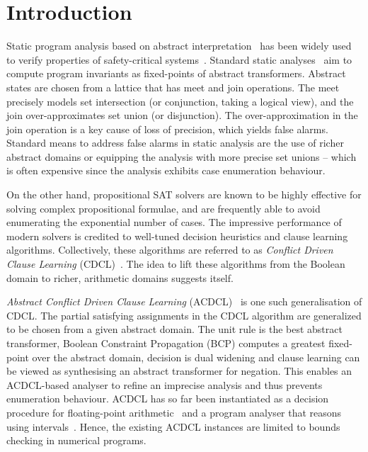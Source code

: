 \section{Introduction}

%
Static program analysis based on abstract interpretation~\cite{CC77} has
been widely used to verify properties of safety-critical systems~\cite{DBLP:conf/pldi/BlanchetCCFMMMR03}.
Standard static analyses~\cite{se2011} aim to compute program invariants as
fixed-points of abstract transformers.  Abstract states are chosen from a
lattice that has meet and join operations.  The meet precisely models set
intersection (or conjunction, taking a logical view), and the join
over-approximates set union (or disjunction).  The over-approximation in the
join operation is a key cause of loss of precision, which yields false
alarms.  Standard means to address false alarms in static analysis are
the use of richer abstract domains or equipping the analysis with more precise set
unions -- which is often expensive since the analysis exhibits case
enumeration behaviour.

%
On the other hand, propositional SAT solvers are known to be highly
effective for solving complex propositional formulae, and are frequently
able to avoid enumerating the exponential number of cases.  The impressive
performance of modern solvers is credited to well-tuned decision heuristics
and clause learning algorithms.  Collectively, these
algorithms are referred to as \emph{Conflict Driven Clause Learning}
(CDCL)~\cite{cdcl}. The idea to lift these algorithms from the Boolean
domain to richer, arithmetic domains suggests itself.

\emph{Abstract Conflict Driven Clause Learning} (ACDCL)~\cite{dhk2013-popl}
is one such generalisation of CDCL.  The partial satisfying assignments in
the CDCL algorithm are generalized to be chosen from a given abstract domain. 
The unit rule is the best abstract transformer, Boolean Constraint
Propagation (BCP) computes a greatest fixed-point over the abstract domain,
decision is dual widening and clause learning can be viewed as synthesising
an abstract transformer for negation.  This enables an ACDCL-based analyser
to refine an imprecise analysis and thus prevents enumeration behaviour. 
ACDCL has so far been instantiated as a decision procedure for
floating-point arithmetic~\cite{DBLP:journals/fmsd/BrainDGHK14} and a
program analyser that reasons using intervals~\cite{tacas12}.  Hence, the
existing ACDCL instances are limited to bounds checking in numerical
programs.

